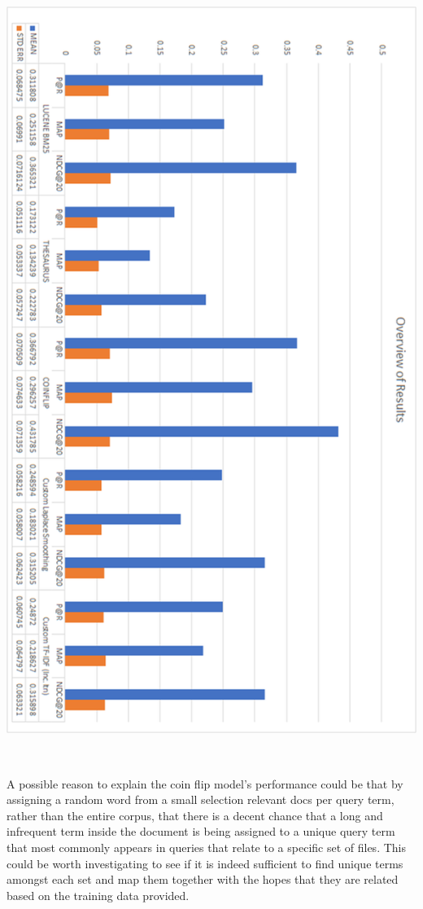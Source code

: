 \documentclass[10pt,a4paper]{article}
\begin{document}
\includegraphics[height=10in]{graph.png}

A possible reason to explain the coin flip model’s performance could be that by assigning a random word from a small selection relevant docs per query term, rather than the entire corpus, that there is a decent chance that a long and infrequent term inside the document is being assigned to a unique query term that most commonly appears in queries that relate to a specific set of files. This could be worth investigating to see if it is indeed sufficient to find unique terms amongst each set and map them together with the hopes that they are related based on the training data provided.
\end{document}
